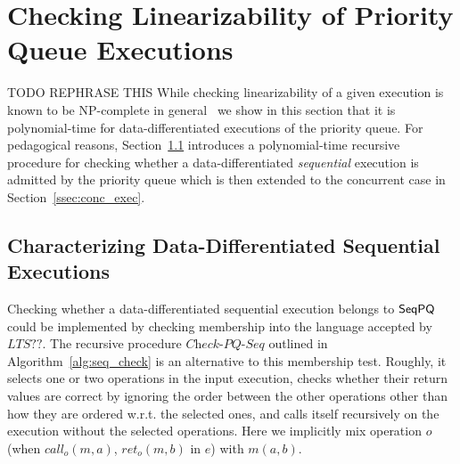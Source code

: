 \section{Checking Linearizability of Priority Queue Executions}
\label{sec:checking inclusion by recursive procedure}

TODO REPHRASE THIS
While checking linearizability of a given execution is known to be NP-complete in general~\cite{journals/siamcomp/GibbonsK97} we show in this section that it is polynomial-time for data-differentiated executions of the priority queue. For pedagogical reasons, Section~\ref{ssec:seq_exec} introduces a polynomial-time recursive procedure for checking whether a data-differentiated \emph{sequential} execution is admitted by the priority queue which is then extended to the concurrent case in Section~\ref{ssec:conc_exec}.

\subsection{Characterizing Data-Differentiated Sequential Executions}\label{ssec:seq_exec}

Checking whether a data-differentiated sequential execution belongs to $\mathsf{SeqPQ}$ could be implemented by checking membership into the language accepted by $LTS??$. The recursive procedure $\textit{Check-PQ-Seq}$ outlined in Algorithm~\ref{alg:seq_check} is an alternative to this membership test. Roughly, it selects one or two operations in the input execution, checks whether their return values are correct by ignoring the order between the other operations other than how they are ordered w.r.t. the selected ones, and calls itself recursively on the execution without the selected operations. {\color {blue} Here we implicitly mix operation $o$ (when $\textit{call}_o(m,a)$, $\textit{ret}_o(m,b)$ in $e$) with $m(a,b)$.}

